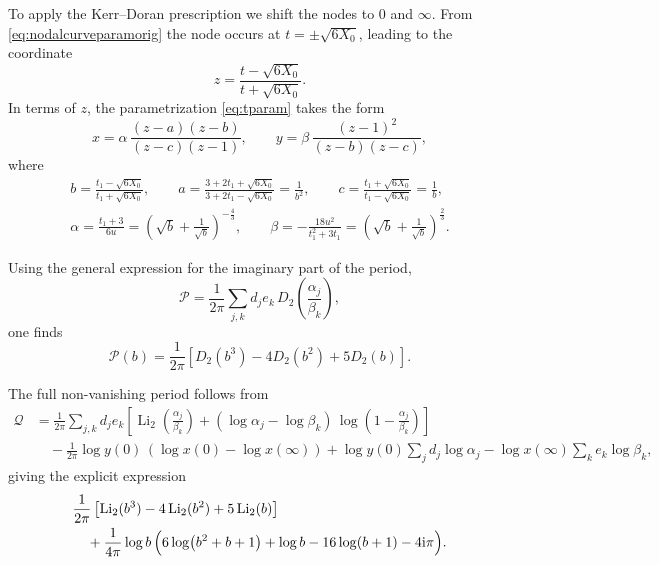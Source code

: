 \documentclass[11pt, a4paper]{article}
\newcommand{\ii}{\mathrm{i}}
\newcommand{\Li}{\operatorname{Li}}
\numberwithin{equation}{section}
\begin{document}
To apply the Kerr–Doran prescription we shift the nodes to $0$ and $\infty$. From \cref{eq:nodalcurveparamorig} the node occurs at $t=\pm\sqrt{6X_0}$, leading to the coordinate
\begin{equation}
  z = \frac{t - \sqrt{6 X_0}}{t + \sqrt{6 X_0}}.
\end{equation}
In terms of $z$, the parametrization \cref{eq:tparam} takes the form
\begin{equation}
  x = \alpha\, \frac{(z-a)(z-b)}{(z-c)(z-1)},
  \qquad
  y = \beta\, \frac{(z-1)^2}{(z-b)(z-c)},
\end{equation}
where
\begin{equation}\label{eq:nodalcurveparams}
\begin{gathered}
  b = \frac{t_1 - \sqrt{6X_0}}{t_1 + \sqrt{6X_0}},
  \qquad
  a = \frac{3 + 2t_1 + \sqrt{6X_0}}{3 + 2t_1 - \sqrt{6X_0}} = \frac{1}{b^2},
  \qquad
  c = \frac{t_1 + \sqrt{6X_0}}{t_1 - \sqrt{6X_0}} = \frac{1}{b},
  \\
  \alpha = \frac{t_1 + 3}{6 u}
  = \left(\sqrt{b} + \frac{1}{\sqrt{b}}\right)^{-\tfrac{4}{3}},
  \qquad
  \beta = -\frac{18 u^2}{t_1^2+3 t_1} = \left(\sqrt{b} + \frac{1}{\sqrt{b}}\right)^{\tfrac{2}{3}}.
\end{gathered}
\end{equation}

Using the general expression for the imaginary part of the period,
\begin{equation}
  \mathcal{P} = \frac{1}{2\pi} \sum_{j,k} d_j e_k\, D_2\!\left(\frac{\alpha_j}{\beta_k}\right),
\end{equation}
one finds
\begin{equation}
  \mathcal{P}(b)
  = \frac{1}{2\pi}\left[ D_2(b^3) - 4D_2(b^2) + 5 D_2(b) \right].
\end{equation}

The full non-vanishing period follows from
\begin{equation}
\begin{aligned}
  \mathcal{Q} 
  &= \frac{1}{2\pi} \sum_{j,k} d_j e_k 
     \left[
       \Li_2\!\left(\frac{\alpha_j}{\beta_k}\right)
       + (\log\alpha_j - \log\beta_k)\,
         \log\!\left(1 - \frac{\alpha_j}{\beta_k}\right)
     \right] \\
  &\quad - \frac{1}{2\pi} \log y(0)\,
        \left(\log x(0) - \log x(\infty)\right)
        + \log y(0) \sum_j d_j \log\alpha_j
        - \log x(\infty) \sum_k e_k \log\beta_k,
\end{aligned}
\end{equation}
giving the explicit expression
\begin{equation}
\begin{aligned}
  &\frac{1}{2\pi}\left[\Li_2(b^3) - 4\Li_2(b^2) + 5\Li_2(b)\right] \\
  &\quad + \frac{1}{4\pi}\log b\,
      \Bigl( 6\log(b^2+b+1) + \log b - 16\log(b+1) - 4\ii\pi \Bigr).
\end{aligned}
\end{equation}
\end{document}
